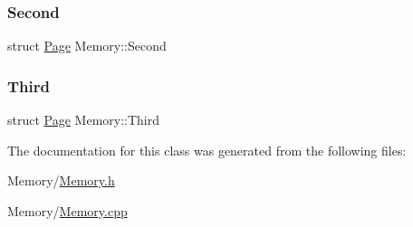 \mbox{\label{classMemory_a9ede2ac970e05bb7380e70b2948e3594}} 
\subsubsection{\texorpdfstring{Second}{Second}}
{\footnotesize\ttfamily struct \mbox{\hyperlink{structPage}{Page}} Memory\+::\+Second}

\mbox{\label{classMemory_a5fa96206a626f01d0772aeeda0d3a83a}} 
\subsubsection{\texorpdfstring{Third}{Third}}
{\footnotesize\ttfamily struct \mbox{\hyperlink{structPage}{Page}} Memory\+::\+Third}



The documentation for this class was generated from the following files\+:\begin{DoxyCompactItemize}
\item 
Memory/\mbox{\hyperlink{Memory_8h}{Memory.\+h}}\item 
Memory/\mbox{\hyperlink{Memory_8cpp}{Memory.\+cpp}}\end{DoxyCompactItemize}
